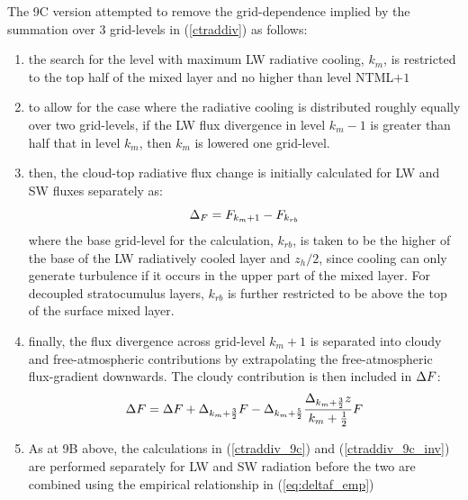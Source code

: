 \documentclass{UMDP_article}
\begin{document}
The 9C version attempted to remove the grid-dependence implied by the
summation over 3 grid-levels in (\ref{ctraddiv}) as follows:
\begin{enumerate}
\item the search for the level with maximum LW radiative
  cooling, $k_m$, is restricted to the top half of the mixed layer and 
  no higher than level NTML$+1$
\item to allow for the case where the radiative cooling is distributed
  roughly equally over two grid-levels, if the LW flux divergence in
  level $k_m-1$ is greater than half that in level $k_m$, then $k_m$
  is lowered one grid-level.
\item then, the cloud-top radiative flux change is initially
  calculated for LW and SW fluxes separately as:
  \begin{equation}
    \Delta_F = F_{k_m+1} - F_{k_{rb}}
    \label{ctraddiv_9c}
  \end{equation}
  where the base grid-level for the calculation, $k_{rb}$, is taken to
  be the higher of the base of the LW radiatively cooled layer and
  $z_h/2$, since cooling can only generate turbulence if it occurs in
  the upper part of the mixed layer.  For decoupled stratocumulus
  layers, $k_{rb}$ is further restricted to be above the top of the
  surface mixed layer.
\item finally, the flux divergence across grid-level $k_m+1$ is
  separated into cloudy and free-atmospheric contributions by
  extrapolating the free-atmospheric flux-gradient downwards.  The
  cloudy contribution is then included in $\Delta F$:
  \begin{equation}
    \Delta F = \Delta F + \Delta_{k_m+\frac{3}{2}} F 
    - \Delta_{k_m+\frac{5}{2}} \frac{\Delta_{k_m+\frac{3}{2}} z}{k_m+\frac{1}{2}} F
    \label{ctraddiv_9c_inv}
  \end{equation}
\item As at 9B above, the calculations in (\ref{ctraddiv_9c}) and
  (\ref{ctraddiv_9c_inv}) are performed separately for LW and SW
  radiation before the two are combined using the empirical
  relationship in (\ref{eq:deltaf_emp})
\end{enumerate}
\end{document}
